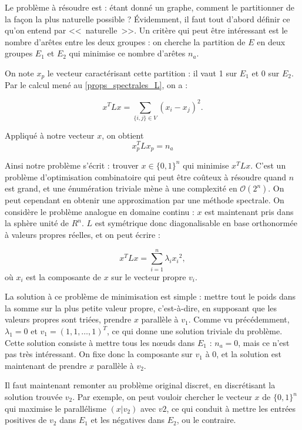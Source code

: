 \documentclass[12pt]{article}
\begin{document}
Le problème à résoudre est : étant donné un graphe, comment le
partitionner de la façon la plus naturelle possible ? Évidemment, il
faut tout d'abord définir ce qu'on entend par <<~naturelle~>>. Un
critère qui peut être intéressant est le nombre d'arêtes entre les
deux groupes : on cherche la partition de $E$ en deux groupes $E_1$ et
$E_2$ qui minimise ce nombre d'arêtes $n_a$.

On note $x_p$ le vecteur caractérisant cette partition : il vaut 1 sur
$E_1$ et 0 sur $E_2$. Par le calcul mené au \ref{props_spectrales_L},
on a :

\begin{equation}
 x^T L x = \sum_{\{i, j\} \in V} (x_i - x_j)^2.
\end{equation}

Appliqué à notre vecteur $x$, on obtient
\begin{equation}
 x_p^T L x_p = n_a
\end{equation}

Ainsi notre problème s'écrit : trouver $x \in \{0,1\}^n$ qui
minimise $x^T L x$. C'est un problème d'optimisation combinatoire
qui peut être coûteux à résoudre quand $n$ est grand, et une
énumération triviale mène à une complexité en $\mathcal O (2^n)$. On peut
cependant en obtenir une approximation par une méthode spectrale. On
considère le problème analogue en domaine continu : $x$ est
maintenant pris dans la sphère unité de $R^n$. $L$ est symétrique donc
diagonalisable en base orthonormée à valeurs propres réelles, et on
peut écrire :

\begin{equation}
 x^T L x = \sum_{i=1}^n \lambda_i {x_i}^2,
\end{equation}
où $x_i$ est la composante de $x$ sur le vecteur propre $v_i$.

La solution à ce problème de minimisation est simple : mettre tout le
poids dans la somme sur la plus petite valeur propre, c'est-à-dire, en
supposant que les valeurs propres sont triées, prendre $x$ parallèle à
$v_1$. Comme vu précédemment, $\lambda_1 = 0$ et $v_1 = (1, 1, \dots,
1)^T$, ce qui donne une solution triviale du problème. Cette solution
consiste à mettre tous les n\oe uds dans $E_1$ : $n_a = 0$, mais ce
n'est pas très intéressant. On fixe donc la composante sur $v_1$ à 0,
et la solution est maintenant de prendre $x$ parallèle à $v_2$.

Il faut maintenant remonter au problème original discret, en
discrétisant la solution trouvée $v_2$. Par exemple, on peut vouloir
chercher le vecteur $x$ de $\{0,1\}^n$ qui maximise le parallélisme
$(x|v_2)$ avec $v2$, ce qui conduit à mettre les entrées positives de
$v_2$ dans $E_1$ et les négatives dans $E_2$, ou le contraire.
\end{document}
